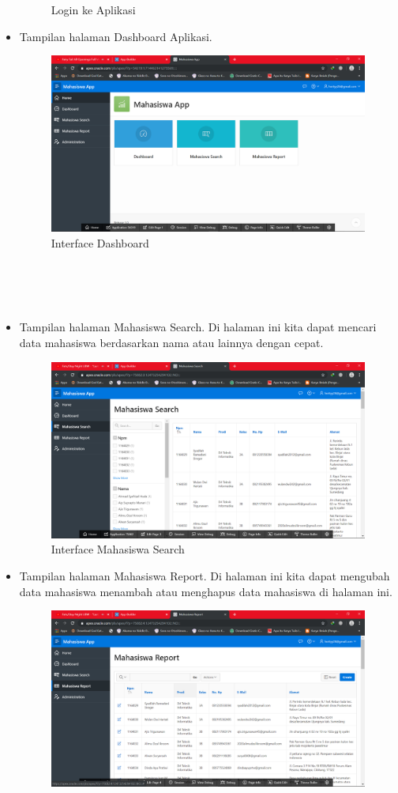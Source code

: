 \documentclass[12pt, times new roman]{article}
\begin{document}
\begin{itemize}
\begin{figure}[htbp]
	\caption{Login ke Aplikasi}
\end{figure}
\item Tampilan halaman Dashboard Aplikasi.
\begin{figure}[htbp]
	\centering
	\includegraphics[width=10.5cm]{figures/28.png}
	\caption{Interface Dashboard}
\end{figure}
\\
\\
\\
\item Tampilan halaman Mahasiswa Search. Di halaman ini kita dapat mencari data mahasiswa berdasarkan nama atau lainnya dengan cepat.
\begin{figure}[htbp]
	\centering
	\includegraphics[width=10.5cm]{figures/29.png}
	\caption{Interface Mahasiswa Search}
\end{figure}
\item Tampilan halaman Mahasiswa Report. Di halaman ini kita dapat mengubah data mahasiswa menambah atau menghapus data mahasiswa di halaman ini.
\begin{figure}[htbp]
	\centering
	\includegraphics[width=10.5cm]{figures/30.png}

\end{figure}
\end{itemize}
\end{document}
